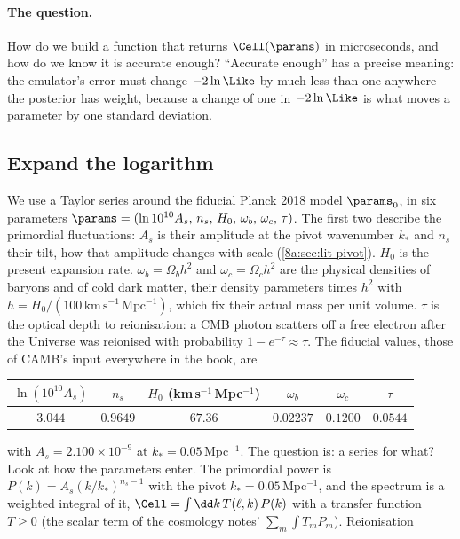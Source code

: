 \paragraph{The question.} How do we build a function that returns $\Cell(\params)$ in microseconds, and how
do we know it is accurate enough? ``Accurate enough'' has a precise meaning: the emulator's error must
change $-2\ln\Like$ by much less than one anywhere the posterior has weight, because a change of one in
$-2\ln\Like$ is what moves a parameter by one standard deviation.

\subsection{Expand the logarithm}
\label{9c:sec:emu-log}

We use a Taylor series around the fiducial Planck 2018 model $\params_0$, in six parameters
$\params=(\ln10^{10}A_s,\,n_s,\,H_0,\,\omega_b,\,\omega_c,\,\tau)$. The first two describe the primordial
fluctuations: $A_s$ is their amplitude at the pivot wavenumber $k_*$ and $n_s$ their tilt, how that amplitude
changes with scale (\cref{8a:sec:lit-pivot}). $H_0$ is the present expansion rate. $\omega_b=\Omega_bh^2$ and
$\omega_c=\Omega_ch^2$ are the physical densities of baryons and of cold dark matter, their density
parameters times $h^2$ with $h=H_0/(100\,\mathrm{km\,s^{-1}\,Mpc^{-1}})$, which fix their actual mass per unit
volume. $\tau$ is the optical depth to reionisation: a CMB photon scatters off a free electron after the
Universe was reionised with probability $1-e^{-\tau}\approx\tau$. The fiducial values, those of CAMB's input everywhere in the book,
are
\begin{center}
\small
\renewcommand{\arraystretch}{1.15}
\begin{tabular}{@{}cccccc@{}}
\toprule
$\ln(10^{10}A_s)$ & $n_s$ & $H_0$ (km\,s$^{-1}$\,Mpc$^{-1}$) & $\omega_b$ & $\omega_c$ & $\tau$\\\midrule
$3.044$ & $0.9649$ & $67.36$ & $0.02237$ & $0.1200$ & $0.0544$\\
\bottomrule
\end{tabular}
\end{center}
with $A_s=2.100\times10^{-9}$ at $k_*=0.05$\,Mpc$^{-1}$. The question is: a series for what?
Look at how the parameters enter. The primordial power is $P(k)=A_s(k/k_*)^{n_s-1}$ with the pivot
$k_*=0.05$\,Mpc$^{-1}$, and the spectrum is a weighted integral of it, $\Cell=\int\dd k\,T(\ell,k)\,P(k)$
with a transfer function $T\ge0$ (the scalar term of the cosmology notes' $\sum_m\int T_mP_m$). Reionisation
